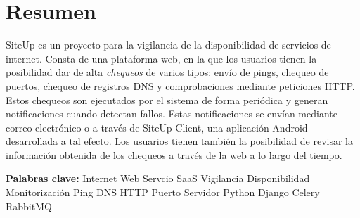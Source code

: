 \section*{Resumen}

SiteUp es un proyecto para la vigilancia de la disponibilidad de servicios de
internet. Consta de una plataforma web, en la que los usuarios tienen la
posibilidad dar de alta \textit{chequeos} de varios tipos: envío de pings,
chequeo de puertos, chequeo de registros DNS y comprobaciones mediante
peticiones HTTP. Estos chequeos son ejecutados por el sistema de forma periódica
y generan notificaciones cuando detectan fallos. Estas notificaciones se envían
mediante correo electrónico o a través de SiteUp Client, una aplicación Android
desarrollada a tal efecto. Los usuarios tienen también la posibilidad de revisar
la información obtenida de los chequeos a través de la web a lo largo del tiempo.

\textbf{Palabras clave:} Internet Web Servcio SaaS Vigilancia Disponibilidad
Monitorización Ping DNS HTTP Puerto Servidor Python Django Celery RabbitMQ

